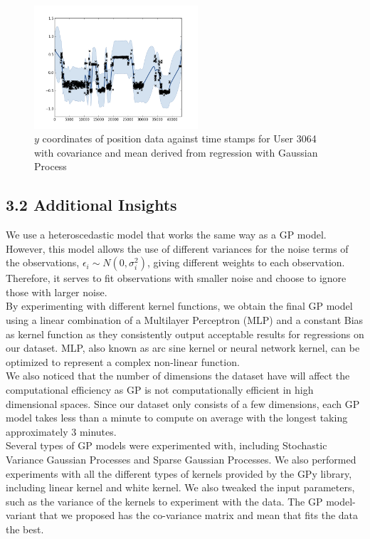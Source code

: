 \documentclass[letterpaper]{article}
\begin{document}
\begin{figure}[h!]
  \centering
    \includegraphics[width=230px,natwidth=665,natheight=361]{selected_GP/3064.csv_Y.png}
  \caption{$y$ coordinates of position data against time stamps for User 3064 with covariance and mean derived from regression with Gaussian Process}
  \label{fig:GP2}
\end{figure}

\subsection{3.2  Additional Insights}

We use a heteroscedastic model that works the same way as a GP model. However, this model allows the use of different variances for the noise terms of the observations, $\epsilon_i \sim N(0, \sigma_i^2)$, giving different weights to each observation. Therefore, it serves to fit observations with smaller noise and choose to ignore those with larger noise. \\

By experimenting with different kernel functions, we obtain the final GP model using a linear combination of a Multilayer Perceptron (MLP) and a constant Bias as kernel function as they consistently output acceptable results for regressions on our dataset. MLP, also known as arc sine kernel or neural network kernel, can be optimized to represent a complex non-linear function. \\

We also noticed that the number of dimensions the dataset have will affect the computational efficiency as GP is not computationally efficient in high dimensional spaces. Since our dataset only consists of a few dimensions, each GP model takes less than a minute to compute on average with the longest taking approximately 3 minutes.\\

Several types of GP models were experimented with, including Stochastic Variance Gaussian Processes and Sparse Gaussian Processes. We also performed experiments with all the different types of kernels provided by the GPy library, including linear kernel and white kernel. We also tweaked the input parameters, such as the variance of the kernels to experiment with the data. The GP model-variant that we proposed has the co-variance matrix and mean that fits the data the best. \\
\end{document}
